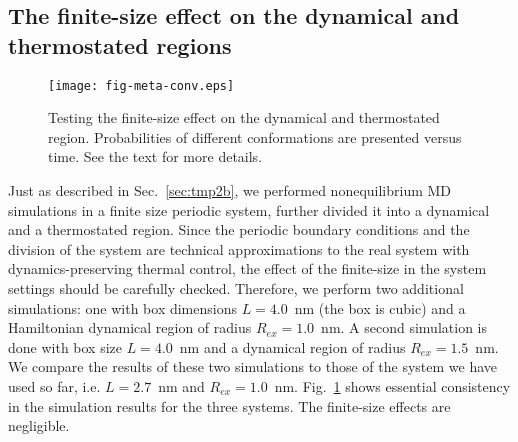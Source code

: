 \documentclass[a4paper,preprint,unsortedaddress,onecolumn]{revtex4-1}
\begin{document}
\subsection{The finite-size effect on the dynamical and thermostated regions}

\begin{figure}
  \centering
  \texttt{[image: fig-meta-conv.eps]}
  \caption{Testing the finite-size effect on the dynamical and thermostated region.
    Probabilities of different conformations are presented versus time.
    See the text for more details.
  }
  \label{fig:tmp7}
\end{figure}

Just as described in Sec.~\ref{sec:tmp2b}, we performed nonequilibrium MD
simulations in a finite size periodic system, further divided it
into a dynamical and a thermostated region.
Since the periodic boundary conditions and the division of the system
are technical approximations to the real system with dynamics-preserving thermal control, 
the effect of the finite-size in 
the system settings should be carefully checked.
Therefore, we
perform two additional simulations: one with box dimensions
$L=4.0$~nm (the box is cubic) and a
Hamiltonian dynamical region of radius $R_{ex} = 1.0$~nm. A second simulation is done with box size $L=4.0$~nm and a dynamical region of
radius $R_{ex} = 1.5$~nm. We compare the results of these two simulations to those of the system we have used so far, i.e. $L=2.7$~nm and $R_{ex} = 1.0$~nm.
Fig.~\ref{fig:tmp7} shows essential consistency in
the simulation results for the three systems. The finite-size effects are
negligible.
\end{document}
